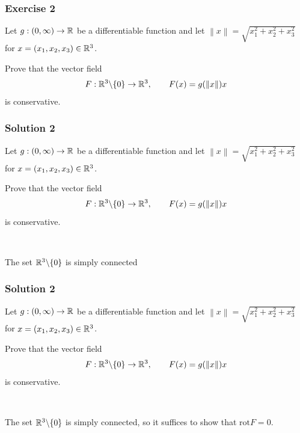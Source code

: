 \documentclass[10pt, t, allowdisplaybreaks]{beamer}
\newcommand{\nullspacesmall}{~\vspace{1em}}
\begin{document}
\begin{frame}
    \frametitle{Exercise 2}
    \par Let $g:(0, \infty)\rightarrow \mathbb{R}$ be a differentiable function and let 
    $\left\lVert x\right\rVert = \sqrt{x^2_1+x^2_2+x^2_3}$ for $x = (x_1, x_2, x_3)\in \mathbb{R}^3$.
    \par Prove that the vector field 
    \begin{equation*}
        F:\mathbb{R}^3\backslash\{0\}\rightarrow \mathbb{R}^3, \qquad F(x) = g(\left\lVert x\right\rVert )x
    \end{equation*}
    is conservative.
\end{frame}

\begin{frame}
    \frametitle{Solution 2}
    \par Let $g:(0, \infty)\rightarrow \mathbb{R}$ be a differentiable function and let 
    $\left\lVert x\right\rVert = \sqrt{x^2_1+x^2_2+x^2_3}$ for $x = (x_1, x_2, x_3)\in \mathbb{R}^3$.
    \par Prove that the vector field 
    \begin{equation*}
        F:\mathbb{R}^3\backslash\{0\}\rightarrow \mathbb{R}^3, \qquad F(x) = g(\left\lVert x\right\rVert )x
    \end{equation*}
    is conservative.
    
    \nullspacesmall

    \par The set $\mathbb{R}^3\backslash\{0\}$ is simply connected
\end{frame}

\begin{frame}
    \frametitle{Solution 2}
    \par Let $g:(0, \infty)\rightarrow \mathbb{R}$ be a differentiable function and let 
    $\left\lVert x\right\rVert = \sqrt{x^2_1+x^2_2+x^2_3}$ for $x = (x_1, x_2, x_3)\in \mathbb{R}^3$.
    \par Prove that the vector field 
    \begin{equation*}
        F:\mathbb{R}^3\backslash\{0\}\rightarrow \mathbb{R}^3, \qquad F(x) = g(\left\lVert x\right\rVert )x
    \end{equation*}
    is conservative.
    
    \nullspacesmall

    \par The set $\mathbb{R}^3\backslash\{0\}$ is simply connected, so it suffices to show that $\text{rot} F = 0$. 
\end{frame}
\end{document}
